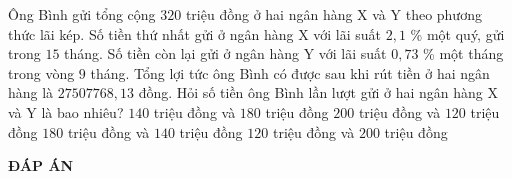 \begin{ex}%
Ông Bình gửi tổng cộng $320$ triệu đồng ở hai ngân hàng X và Y theo phương thức lãi kép. Số tiền thứ nhất gửi ở ngân hàng X với lãi suất $2{,}1$ \% một quý,
gửi trong $15$ tháng. Số tiền còn lại gửi ở ngân hàng Y với lãi suất $0{,}73$ \% một tháng trong vòng $9$ tháng.
Tổng lợi tức ông Bình có được sau khi rút tiền ở hai ngân hàng là $27507768{,}13$ đồng. Hỏi số tiền ông Bình lần lượt gửi ở hai ngân hàng X và Y là bao nhiêu?
\choice
{\True $140$ triệu đồng và $180$ triệu đồng}
{$200$ triệu đồng và $120$ triệu đồng}
{$180$ triệu đồng và $140$ triệu đồng}
{$120$ triệu đồng và $200$ triệu đồng}
\end{ex}


\newpage
\begin{center}
	\textbf{ĐÁP ÁN}
\end{center}
\begin{multicols}{10}
	
\end{multicols} 